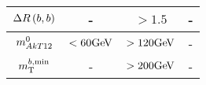 \begin{table}[htpb]
\begin{center}
\begin{tabular}{c||c|c|c}
\hline
 $\Delta R\left(b,b\right)$                        & -                                               & $>1.5$ & -                    \\ 
\hline
 $m^{0}_{AkT12}$                 & $<60\gev$                                               & $>120\gev$ & -                    \\ 
\hline
 $m_{\mathrm{T}}^{b,\mathrm{min}}$                 & -                                               & $>200\gev$ & -                    \\ 
       \hline\hline
    \end{tabular}
  \end{center}
  \label{tab:selectionCRWSTTTGamma}
\end{table}



